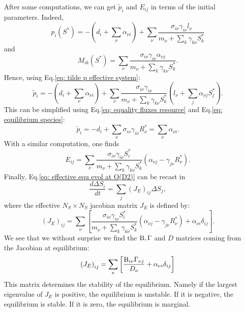 \documentclass[12pt, titlepage, twoside, openright]{report}
\begin{document}
After some computations, we can get $\tilde{p}_i$ and $E_{ij}$ in terms of the initial parameters. Indeed,
\begin{equation}
p_i(S^*)= -\left(d_i + \sum_\nu \alpha_{\nu i}\right) + \sum_\nu \frac{\sigma_{i\nu}\gamma_{i\nu}l_\nu}{m_\nu + \sum_k \gamma_{k\nu}S^*_k}
\end{equation}
and
\begin{equation}
M_{ik}(S^*) = \sum_\nu \frac{\sigma_{i\nu}\gamma_{i\nu}\alpha_{\nu j}}{m_\nu + \sum_k \gamma_{k\nu}S^*_k}.
\end{equation}
Hence, using Eq.\eqref{eq: tilde p effective system}:
\begin{equation}
\tilde{p}_i = - \left(d_i + \sum_\nu \alpha_{\nu i}\right) + \sum_\nu \frac{\sigma_{i\nu}\gamma_{i\nu}}{m_\nu + \sum_k \gamma_{k\nu}S^*_k}\left(l_\nu+\sum_{j}\alpha_{\nu j} S^*_j\right).
\end{equation}
This can be simplified using Eq.\eqref{eq: equality fluxes resource} and Eq.\eqref{eq: equilibrium species}:
\begin{equation}
\tilde{p}_i=-d_i +\sum_\nu \sigma_{i\nu}\gamma_{i\nu}R^*_\nu = \sum_\nu \alpha_{\nu i}.
\end{equation}
With a similar computation, one finds
\begin{equation}
E_{ij}=\sum_\nu \frac{\sigma_{i\nu}\gamma_{i\nu}S^*_i}{m_\nu+\sum_k \gamma_{k\nu}S^*_k} \left(\alpha_{\nu j}-\gamma_{j\nu}R^*_\nu\right).
\end{equation}
Finally, Eq.\eqref{eq: effective equ evol at O(D2)} can be recast in
\begin{equation}
\frac{d\Delta S_i}{dt} = \sum_j (J_E)_{ij} \Delta S_j,
\end{equation}
where the effective $N_S\times N_S$ jacobian matrix $J_E$ is defined by:
\begin{equation}
(J_E)_{ij}=\sum_\nu \left[\frac{\sigma_{i\nu}\gamma_{i\nu}S^*_i}{m_\nu+\sum_k \gamma_{k\nu}S^*_k} \left(\alpha_{\nu j}-\gamma_{j\nu}R^*_\nu\right)+\alpha_{\nu i}\delta_{ij}\right].
\end{equation}
We see that we without surprise we find the $\text{B}, \Gamma $ and $D$ matrices coming from the Jacobian at equilibrium:
\begin{equation}
\left(J_E\right)_{ij}=\sum_\nu \left[\frac{\text{B}_{i\nu}\Gamma_{\nu j}}{D_\nu}+\alpha_{\nu i} \delta_{ij}\right]
\end{equation}
This matrix determines the stability of the equilibrium. Namely if the largest eigenvalue of $J_E$ is positive, the equilibrium is unstable. If it is negative, the equilibrium is stable. If it is zero, the equilibrium is marginal.
\end{document}
